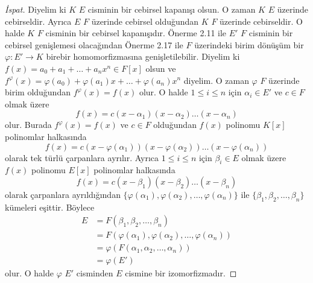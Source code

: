 \documentclass[draft]{article}
\theoremstyle{definition}
\theoremstyle{remark}
\begin{document}
    		\begin{proof}[İspat]
    	        Diyelim ki $K$ $E$ cisminin bir cebirsel kapanışı olsun. O zaman $K$ $E$ üzerinde cebirseldir. Ayrıca $E$ $F$ üzerinde cebirsel olduğundan $K$ $F$ üzerinde cebirseldir. O halde $K$ $F$ cisminin bir cebirsel kapanışıdır. Önerme 2.11 ile $E'$ $F$ cisminin bir cebirsel genişlemesi olacağından Önerme 2.17 ile $F$ üzerindeki birim dönüşüm bir $\varphi: E' \to K$ birebir homomorfizmasına genişletilebilir. Diyelim ki $f(x) = a_0 + a_1 + \dots + a_nx^n \in F[x]$ olsun ve $f^\varphi(x) = \varphi(a_0) + \varphi(a_1)x + \dots + \varphi(a_n)x^n$ diyelim. O zaman $\varphi$ $F$ üzerinde birim olduğundan $f^\varphi(x) = f(x)$ olur. O halde $1 \leq i \leq n$ için $\alpha_i \in E'$ ve $c \in F$ olmak üzere
    	        \begin{equation*}
    	            f(x) = c (x - \alpha_1) (x - \alpha_2) \dots (x - \alpha_n)
    	        \end{equation*}
    	        olur. Burada $f^\varphi(x) = f(x)$ ve $c \in F$ olduğundan $f(x)$ polinomu $K[x]$ polinomlar halkasında
    	        \begin{equation*}
    	            f(x) = c (x - \varphi(\alpha_1)) (x - \varphi(\alpha_2)) \dots (x - \varphi(\alpha_n))
    	        \end{equation*}
    	        olarak tek türlü çarpanlara ayrılır. Ayrıca $1 \leq i \leq n$ için $\beta_i \in E$ olmak üzere $f(x)$ polinomu $E[x]$ polinomlar halkasında
    	        \begin{equation*}
    	            f(x) = c (x - \beta_1) (x - \beta_2) \dots (x - \beta_n)
    	        \end{equation*}
    	        olarak çarpanlara ayrıldığından $\{\varphi(\alpha_1), \varphi(\alpha_2), \dots, \varphi(\alpha_n)\}$ ile $\{\beta_1, \beta_2, \dots, \beta_n\}$ kümeleri eşittir. Böylece
    	        \begin{align*}
    	            E &= F(\beta_1, \beta_2, \dots, \beta_n)\\
    	            &= F(\varphi(\alpha_1), \varphi(\alpha_2), \dots, \varphi(\alpha_n))\\\
    	            &= \varphi(F(\alpha_1, \alpha_2, \dots, \alpha_n))\\
    	            &= \varphi(E')
    	        \end{align*}
    	        olur. O halde $\varphi$ $E'$ cisminden $E$ cismine bir izomorfizmadır.
    	    \end{proof}
	        
\end{document}
